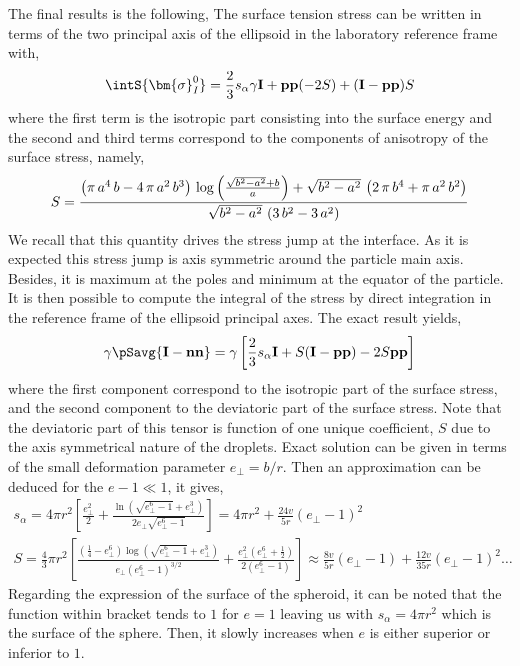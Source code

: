The final results is the following, 
The surface tension stress can be written in terms of the two principal axis of the ellipsoid in the laboratory reference frame with, 
\begin{equation*}
    \intS{\bm{\sigma}_I^0}
    = \frac{2}{3} s_\alpha \gamma \textbf{I} + \textbf{pp} (-2 S)  + (\textbf{I} - \textbf{pp}){S}
\end{equation*}
where the first term is the isotropic part consisting into the surface energy and the second and third terms correspond to the components of anisotropy of the surface stress, namely, 
\begin{align*}
    S
    = 
    {{\left(\pi\,a^4\,b-4\,\pi\,a^2\,b^3\right)\,\log \left({{\sqrt{b^2
    -a^2}+b}\over{a}}\right)+\sqrt{b^2-a^2}\,\left(2\,\pi\,b^4+\pi\,a^2
    \,b^2\right)}\over{\sqrt{b^2-a^2}\,\left(3\,b^2-3\,a^2\right)}}
\end{align*}
We recall that this quantity drives the stress jump at the interface. 
As it is expected this stress jump is axis symmetric around the particle main axis. 
Besides, it is maximum at the poles and minimum at the equator of the particle. 
It is then possible to compute the integral of the stress by direct integration in the reference frame of the ellipsoid principal axes. 
The exact result yields, 
\begin{equation*}
    \gamma\pSavg{\textbf{I}-\textbf{nn}}
    = \gamma \left[
        \frac{2}{3} s_\alpha \textbf{I}
        + S (\textbf{I}-\textbf{pp}) -2S\textbf{pp}
        \right]
\end{equation*}
where the first component correspond to the isotropic part of the surface stress, and the second component to the deviatoric part of the surface stress. 
Note that the deviatoric part of this tensor is function of one unique coefficient, $S$ due to the axis symmetrical nature of the droplets. 
Exact solution can be given in terms of the small deformation parameter $e_\bot = b/r$. 
Then an approximation can be deduced for the $e -1 \ll 1$, it gives,
\begin{align*}
    s_\alpha 
    = 4\pi r^2 \left[\frac{e_\bot^2}{2} + \frac{\ln\left(\sqrt{{e_\bot^6}-1}+{e_\bot^3}\right)}{2e_\bot\sqrt{e_\bot^6-1}}\right]
    = 4 \pi r^2 + \frac{24 v }{5 r} (e_\bot-1)^2\\
    S = \frac{4}{3} \pi r^2 \left[
    \frac{\left( \frac{1}{4} - e_\bot^6\right)  \log{\left( \sqrt{e_\bot^6-1}+{e_\bot^3}\right) } }
    { e_\bot  \left( e_\bot^6- 1\right)^{3/2} }
    +  \frac{e_\bot^2\left( e_\bot^6+  \frac{1}{2}\right)}{2\left( e_\bot^6- 1\right)}  \right]
    \approx 
    \frac{8 v}{5 r}(e_\bot-1) + \frac{12 v }{35r}(e_\bot-1)^2 \ldots
\end{align*}
Regarding the expression of the surface of the spheroid, it can be noted that the function within bracket tends to $1$ for $e=1$ leaving us with $s_\alpha = 4\pi r^2$ which is the surface of the sphere. 
Then, it slowly increases when $e$ is either superior or inferior to $1$. 

